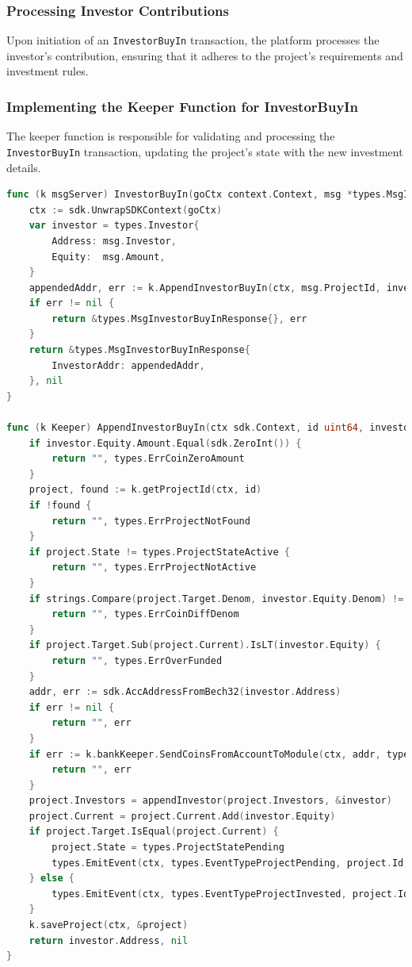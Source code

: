 \subsubsection{Processing Investor Contributions}
\label{subsubsec:processing-investor-contributions}

Upon initiation of an \texttt{InvestorBuyIn} transaction, the platform processes the investor's contribution, ensuring that it adheres to the project's requirements and investment rules.

\subsubsection{Implementing the Keeper Function for InvestorBuyIn}
\label{subsubsec:keeper-investor-buyin}

The keeper function is responsible for validating and processing the \texttt{InvestorBuyIn} transaction, updating the project's state with the new investment details.

\begin{lstlisting}[language=go, caption=Keeper implementation for Investor Buy-in, label={lst:keeper_investor_buyin}]
func (k msgServer) InvestorBuyIn(goCtx context.Context, msg *types.MsgInvestorBuyIn) (*types.MsgInvestorBuyInResponse, error) {
	ctx := sdk.UnwrapSDKContext(goCtx)
	var investor = types.Investor{
		Address: msg.Investor,
		Equity:  msg.Amount,
	}
	appendedAddr, err := k.AppendInvestorBuyIn(ctx, msg.ProjectId, investor)
	if err != nil {
		return &types.MsgInvestorBuyInResponse{}, err
	}
	return &types.MsgInvestorBuyInResponse{
		InvestorAddr: appendedAddr,
	}, nil
}

func (k Keeper) AppendInvestorBuyIn(ctx sdk.Context, id uint64, investor types.Investor) (string, error) {
	if investor.Equity.Amount.Equal(sdk.ZeroInt()) {
		return "", types.ErrCoinZeroAmount
	}
	project, found := k.getProjectId(ctx, id)
	if !found {
		return "", types.ErrProjectNotFound
	}
	if project.State != types.ProjectStateActive {
		return "", types.ErrProjectNotActive
	}
	if strings.Compare(project.Target.Denom, investor.Equity.Denom) != 0 {
		return "", types.ErrCoinDiffDenom
	}
	if project.Target.Sub(project.Current).IsLT(investor.Equity) {
		return "", types.ErrOverFunded
	}
	addr, err := sdk.AccAddressFromBech32(investor.Address)
	if err != nil {
		return "", err
	}
	if err := k.bankKeeper.SendCoinsFromAccountToModule(ctx, addr, types.ModuleName, sdk.NewCoins(investor.Equity)); err != nil {
		return "", err
	}
	project.Investors = appendInvestor(project.Investors, &investor)
	project.Current = project.Current.Add(investor.Equity)
	if project.Target.IsEqual(project.Current) {
		project.State = types.ProjectStatePending
		types.EmitEvent(ctx, types.EventTypeProjectPending, project.Id, investor.Address)
	} else {
		types.EmitEvent(ctx, types.EventTypeProjectInvested, project.Id, investor.Address)
	}
	k.saveProject(ctx, &project)
	return investor.Address, nil
}
\end{lstlisting}

